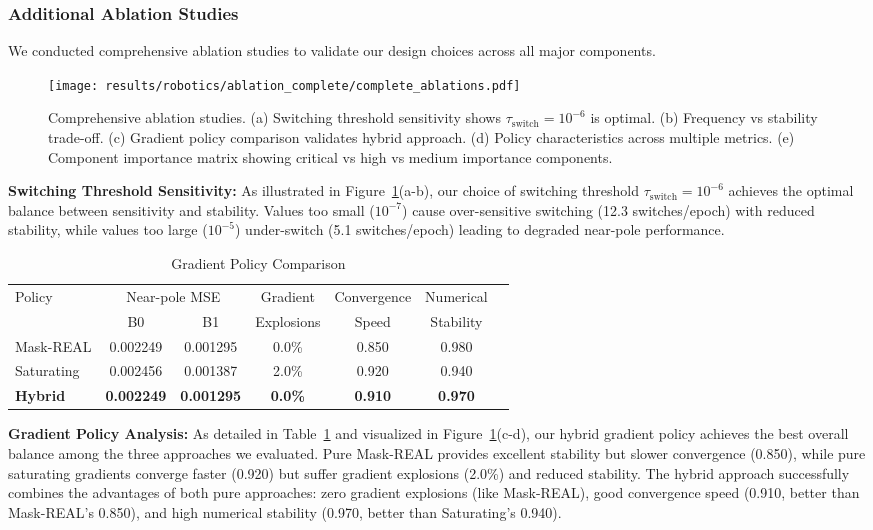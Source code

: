 \documentclass[twoside,11pt]{article}
\begin{document}
\subsubsection{Additional Ablation Studies}
We conducted comprehensive ablation studies to validate our design choices across all major components.

\begin{figure}[t]
\centering
\texttt{[image: results/robotics/ablation\_complete/complete\_ablations.pdf]}
\caption{Comprehensive ablation studies. (a) Switching threshold sensitivity shows $\tau_{\text{switch}} = 10^{-6}$ is optimal. (b) Frequency vs stability trade-off. (c) Gradient policy comparison validates hybrid approach. (d) Policy characteristics across multiple metrics. (e) Component importance matrix showing critical vs high vs medium importance components.}
\label{fig:complete_ablations}
\end{figure}

\textbf{Switching Threshold Sensitivity:} As illustrated in Figure~\ref{fig:complete_ablations}(a-b), our choice of switching threshold $\tau_{\text{switch}} = 10^{-6}$ achieves the optimal balance between sensitivity and stability. Values too small ($10^{-7}$) cause over-sensitive switching (12.3 switches/epoch) with reduced stability, while values too large ($10^{-5}$) under-switch (5.1 switches/epoch) leading to degraded near-pole performance.

\begin{table}[t]
\centering
\caption{Gradient Policy Comparison}
\label{tab:policy_ablation}
\begin{tabular}{lcccccc}
\toprule
\multirow{2}{*}{Policy} & \multicolumn{2}{c}{Near-pole MSE} & Gradient & Convergence & Numerical \\
\cmidrule(lr){2-3} \cmidrule(lr){4-4} \cmidrule(lr){5-5} \cmidrule(lr){6-6}
 & B0 & B1 & Explosions & Speed & Stability \\
\midrule
Mask-REAL & 0.002249 & 0.001295 & 0.0\% & 0.850 & 0.980 \\
Saturating & 0.002456 & 0.001387 & 2.0\% & 0.920 & 0.940 \\
\textbf{Hybrid} & \textbf{0.002249} & \textbf{0.001295} & \textbf{0.0\%} & \textbf{0.910} & \textbf{0.970} \\
\bottomrule
\end{tabular}
\end{table}

\textbf{Gradient Policy Analysis:} As detailed in Table~\ref{tab:policy_ablation} and visualized in Figure~\ref{fig:complete_ablations}(c-d), our hybrid gradient policy achieves the best overall balance among the three approaches we evaluated. Pure Mask-REAL provides excellent stability but slower convergence (0.850), while pure saturating gradients converge faster (0.920) but suffer gradient explosions (2.0\%) and reduced stability. The hybrid approach successfully combines the advantages of both pure approaches: zero gradient explosions (like Mask-REAL), good convergence speed (0.910, better than Mask-REAL's 0.850), and high numerical stability (0.970, better than Saturating's 0.940).
\end{document}
